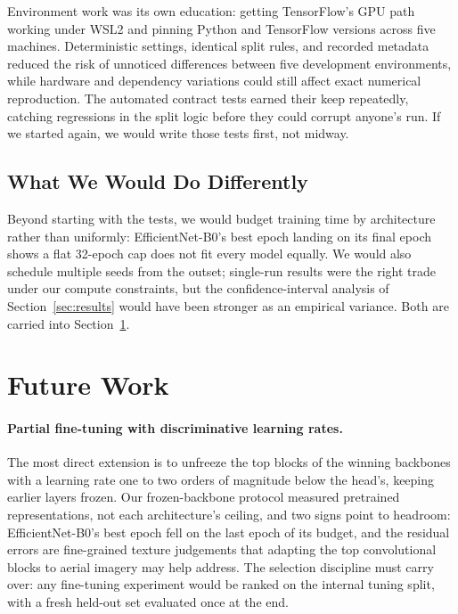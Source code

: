 \documentclass[11pt,twoside,a4paper]{article}
\begin{document}
Environment work was its own education: getting TensorFlow's GPU path
working under WSL2 and pinning Python and TensorFlow versions across five
machines. Deterministic settings, identical split rules, and recorded metadata
reduced the risk of unnoticed differences between five development
environments, while hardware and dependency variations could still affect
exact numerical reproduction. The
automated contract tests earned their keep repeatedly, catching regressions
in the split logic before they could corrupt anyone's run. If we started
again, we would write those tests first, not midway.

\subsection{What We Would Do Differently}

Beyond starting with the tests, we would budget training time by
architecture rather than uniformly: EfficientNet-B0's best epoch landing
on its final epoch shows a flat 32-epoch cap does not fit every model
equally. We would also schedule multiple seeds from the outset; single-run
results were the right trade under our compute constraints, but the
confidence-interval analysis of Section~\ref{sec:results} would have been
stronger as an empirical variance. Both are carried into
Section~\ref{sec:future}.


\section{Future Work}
\label{sec:future}

\paragraph{Partial fine-tuning with discriminative learning rates.}
The most direct extension is to unfreeze the top blocks of the winning
backbones with a learning rate one to two orders of magnitude below the
head's, keeping earlier layers frozen. Our frozen-backbone protocol measured
pretrained representations, not each architecture's ceiling, and two signs
point to headroom: EfficientNet-B0's best epoch fell on the last epoch of
its budget, and the residual errors are fine-grained texture judgements that
adapting the top convolutional blocks to aerial imagery may help address. The
selection discipline must carry over: any fine-tuning experiment
would be ranked on the internal tuning split, with a fresh held-out set
evaluated once at the end.
\end{document}
